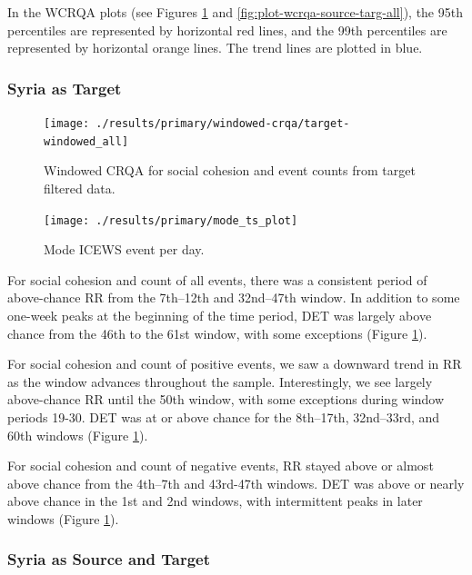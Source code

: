 \documentclass[
  english,
  man]{apa6}
\begin{document}
In the WCRQA plots (see Figures \ref{fig:plot-wcrqa-targ-all} and
\ref{fig:plot-wcrqa-source-targ-all}), the 95th percentiles are represented by
horizontal red lines, and the 99th percentiles are represented by horizontal
orange lines. The trend lines are plotted in blue.

\hypertarget{syria-as-target-1}{%
\subsubsection{Syria as Target}\label{syria-as-target-1}}

\begin{figure}
\texttt{[image: ./results/primary/windowed-crqa/target-windowed\_all]} \caption{Windowed CRQA for social cohesion and event counts from target filtered data.}\label{fig:plot-wcrqa-targ-all}
\end{figure}

\begin{figure}
\texttt{[image: ./results/primary/mode\_ts\_plot]} \caption{Mode ICEWS event per day.}\label{fig:plot-mode-event}
\end{figure}

For social cohesion and count of all events, there was a consistent period of
above-chance RR from the 7th--12th and 32nd--47th window. In addition to some
one-week peaks at the beginning of the time period, DET was largely above chance
from the 46th to the 61st window, with some exceptions (Figure
\ref{fig:plot-wcrqa-targ-all}).

For social cohesion and count of positive events, we saw a downward trend in RR
as the window advances throughout the sample. Interestingly, we see largely
above-chance RR until the 50th window, with some exceptions during window
periods 19-30. DET was at or above chance for the 8th--17th, 32nd--33rd, and
60th windows (Figure \ref{fig:plot-wcrqa-targ-all}).

For social cohesion and count of negative events, RR stayed above or almost
above chance from the 4th--7th and 43rd-47th windows. DET was above or nearly
above chance in the 1st and 2nd windows, with intermittent peaks in later
windows (Figure \ref{fig:plot-wcrqa-targ-all}).

\hypertarget{syria-as-source-and-target-1}{%
\subsubsection{Syria as Source and Target}\label{syria-as-source-and-target-1}}
\end{document}

